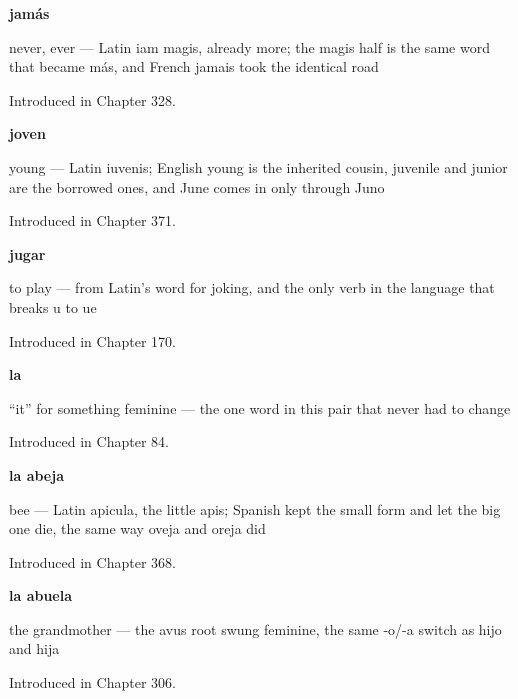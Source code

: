 \noindent\begin{minipage}[t]{\linewidth}
\raggedright
\textbf{jamás}\par
\small never, ever — Latin iam magis, already more; the magis half is the same word that became más, and French jamais took the identical road\par
\footnotesize Introduced in Chapter 328.
\end{minipage}\par\medskip

\noindent\begin{minipage}[t]{\linewidth}
\raggedright
\textbf{joven}\par
\small young — Latin iuvenis; English young is the inherited cousin, juvenile and junior are the borrowed ones, and June comes in only through Juno\par
\footnotesize Introduced in Chapter 371.
\end{minipage}\par\medskip

\noindent\begin{minipage}[t]{\linewidth}
\raggedright
\textbf{jugar}\par
\small to play — from Latin's word for joking, and the only verb in the language that breaks u to ue\par
\footnotesize Introduced in Chapter 170.
\end{minipage}\par\medskip

\noindent\begin{minipage}[t]{\linewidth}
\raggedright
\textbf{la}\par
\small \textquotedblleft{}it\textquotedblright{} for something feminine — the one word in this pair that never had to change\par
\footnotesize Introduced in Chapter 84.
\end{minipage}\par\medskip

\noindent\begin{minipage}[t]{\linewidth}
\raggedright
\textbf{la abeja}\par
\small bee — Latin apicula, the little apis; Spanish kept the small form and let the big one die, the same way oveja and oreja did\par
\footnotesize Introduced in Chapter 368.
\end{minipage}\par\medskip

\noindent\begin{minipage}[t]{\linewidth}
\raggedright
\textbf{la abuela}\par
\small the grandmother --- the avus root swung feminine, the same -o/-a switch as hijo and hija\par
\footnotesize Introduced in Chapter 306.
\end{minipage}\par\medskip

